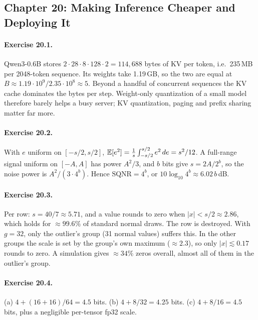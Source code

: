\subsection*{Chapter 20: Making Inference Cheaper and Deploying It}

\paragraph{Exercise 20.1.} Qwen3-0.6B stores $2\cdot28\cdot8\cdot128\cdot2=114{,}688$ bytes
of KV per token, i.e.\ 235\,MB per 2048-token sequence. Its weights take 1.19\,GB, so the
two are equal at $B\approx1.19\cdot10^9/2.35\cdot10^8\approx5$. Beyond a handful of
concurrent sequences the KV cache dominates the bytes per step. Weight-only quantization
of a small model therefore barely helps a busy server; KV quantization, paging and
prefix sharing matter far more.

\paragraph{Exercise 20.2.} With $e$ uniform on $[-s/2,s/2]$,
$\mathbb{E}[e^2]=\frac1s\int_{-s/2}^{s/2}e^2\,de=s^2/12$. A full-range signal uniform on $[-A,A]$
has power $A^2/3$, and $b$ bits give $s=2A/2^b$, so the noise power is
$A^2/(3\cdot4^b)$. Hence $\mathrm{SQNR}=4^b$, or $10\log_{10}4^b\approx6.02\,b$\,dB.

\paragraph{Exercise 20.3.} Per row: $s=40/7\approx5.71$, and a value rounds to zero when
$|x|<s/2\approx2.86$, which holds for $\approx99.6\%$ of standard normal draws. The row is
destroyed. With $g=32$, only the outlier's group (31 normal values) suffers this. In the
other groups the scale is set by the group's own maximum ($\approx2.3$), so only
$|x|\lesssim0.17$ rounds to zero. A simulation gives $\approx34\%$ zeros overall, almost
all of them in the outlier's group.

\paragraph{Exercise 20.4.} (a) $4+(16+16)/64=4.5$ bits. (b) $4+8/32=4.25$ bits.
(c) $4+8/16=4.5$ bits, plus a negligible per-tensor fp32 scale.

